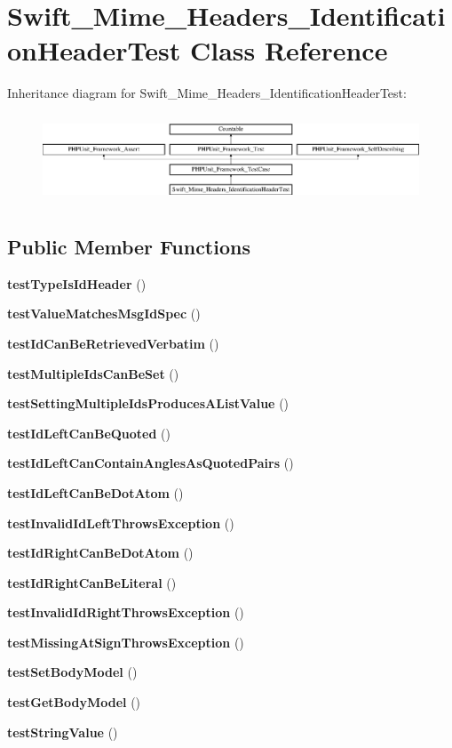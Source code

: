 \section{Swift\+\_\+\+Mime\+\_\+\+Headers\+\_\+\+Identification\+Header\+Test Class Reference}
\label{class_swift___mime___headers___identification_header_test}
Inheritance diagram for Swift\+\_\+\+Mime\+\_\+\+Headers\+\_\+\+Identification\+Header\+Test\+:\begin{figure}[H]
\begin{center}
\leavevmode
\includegraphics[height=2.647754cm]{class_swift___mime___headers___identification_header_test}
\end{center}
\end{figure}
\subsection*{Public Member Functions}
\begin{DoxyCompactItemize}
\item 
{\bf test\+Type\+Is\+Id\+Header} ()
\item 
{\bf test\+Value\+Matches\+Msg\+Id\+Spec} ()
\item 
{\bf test\+Id\+Can\+Be\+Retrieved\+Verbatim} ()
\item 
{\bf test\+Multiple\+Ids\+Can\+Be\+Set} ()
\item 
{\bf test\+Setting\+Multiple\+Ids\+Produces\+A\+List\+Value} ()
\item 
{\bf test\+Id\+Left\+Can\+Be\+Quoted} ()
\item 
{\bf test\+Id\+Left\+Can\+Contain\+Angles\+As\+Quoted\+Pairs} ()
\item 
{\bf test\+Id\+Left\+Can\+Be\+Dot\+Atom} ()
\item 
{\bf test\+Invalid\+Id\+Left\+Throws\+Exception} ()
\item 
{\bf test\+Id\+Right\+Can\+Be\+Dot\+Atom} ()
\item 
{\bf test\+Id\+Right\+Can\+Be\+Literal} ()
\item 
{\bf test\+Invalid\+Id\+Right\+Throws\+Exception} ()
\item 
{\bf test\+Missing\+At\+Sign\+Throws\+Exception} ()
\item 
{\bf test\+Set\+Body\+Model} ()
\item 
{\bf test\+Get\+Body\+Model} ()
\item 
{\bf test\+String\+Value} ()
\end{DoxyCompactItemize}
